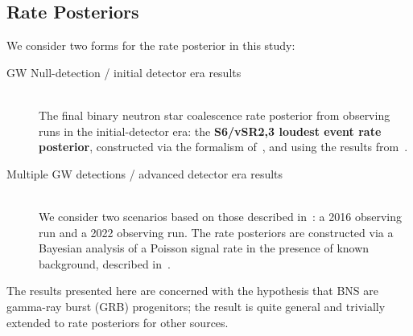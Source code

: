 \documentclass[a0,landscape]{a0poster}
\newcommand{\cbcrate}{{{\mathcal R}}}
\def\grb#1{gamma-ray burst#1 (GRB#1)\gdef\grb{GRB}}
\begin{document}
\begin{multicols}{4}
\subsection*{Rate Posteriors}
We consider two forms for the rate posterior in this study:
\begin{description}
    \item [GW Null-detection / initial detector era results]
         ~\\The final binary neutron star coalescence rate posterior from observing
        runs in the initial-detector era: the {\bf S6/vSR2,3 loudest event rate
        posterior}, constructed via the formalism
        of~\cite{2008CQGra..25j5002B},
        and using the results from~\cite{s6lowmass}.
    \item [Multiple GW detections / advanced detector era results]
         ~\\We consider two scenarios based on those described
         in~\cite{2013arXiv1304.0670L}: a 2016 observing run and a 2022 observing run.
         The rate posteriors are constructed via a Bayesian analysis of a
         Poisson signal rate in the presence of known background, described
         in~\cite{Gregory05}.
\end{description}
%
The results presented here are concerned with the hypothesis that BNS are \grb{}
progenitors;  the result is quite general and trivially extended to rate
posteriors for other sources.
    

\end{multicols}
\end{document}

